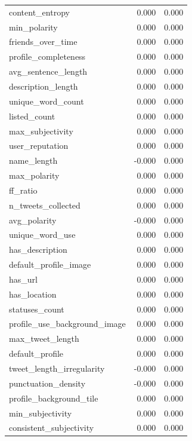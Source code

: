\begin{tabular}{lrr}
content_entropy & 0.000 & 0.000 \\
min_polarity & 0.000 & 0.000 \\
friends_over_time & 0.000 & 0.000 \\
profile_completeness & 0.000 & 0.000 \\
avg_sentence_length & 0.000 & 0.000 \\
description_length & 0.000 & 0.000 \\
unique_word_count & 0.000 & 0.000 \\
listed_count & 0.000 & 0.000 \\
max_subjectivity & 0.000 & 0.000 \\
user_reputation & 0.000 & 0.000 \\
name_length & -0.000 & 0.000 \\
max_polarity & 0.000 & 0.000 \\
ff_ratio & 0.000 & 0.000 \\
n_tweets_collected & 0.000 & 0.000 \\
avg_polarity & -0.000 & 0.000 \\
unique_word_use & 0.000 & 0.000 \\
has_description & 0.000 & 0.000 \\
default_profile_image & 0.000 & 0.000 \\
has_url & 0.000 & 0.000 \\
has_location & 0.000 & 0.000 \\
statuses_count & 0.000 & 0.000 \\
profile_use_background_image & 0.000 & 0.000 \\
max_tweet_length & 0.000 & 0.000 \\
default_profile & 0.000 & 0.000 \\
tweet_length_irregularity & -0.000 & 0.000 \\
punctuation_density & -0.000 & 0.000 \\
profile_background_tile & 0.000 & 0.000 \\
min_subjectivity & 0.000 & 0.000 \\
consistent_subjectivity & 0.000 & 0.000 \\
\bottomrule
\end{tabular}
